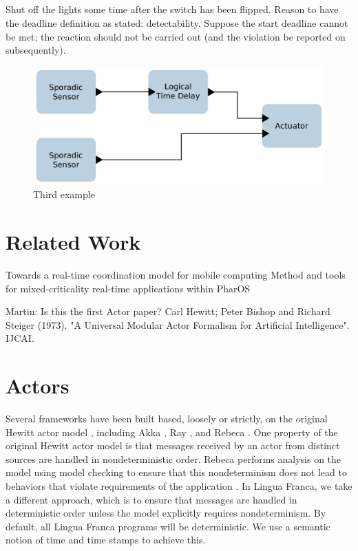 \documentclass[sigconf]{acmart}
\newcommand{\martin}[1]{{\color{blue} Martin: #1}}
\begin{document}
\subsection{}
Shut off the lights some time after the switch has been flipped. Reason to have the deadline definition as stated: detectability. Suppose the start deadline cannot be met; the reaction should not be carried out (and the violation be reported on subsequently).

\begin{figure}[ht]
 \centering
 \includegraphics[width=\linewidth]{img/example-3}
 \caption{Third example}
 \label{fig:example-3}
\end{figure}

\section{Related Work}
\label{sec:related}
Towards a real-time coordination model for mobile computing \cite{hackmann2005towards}
Method and tools for mixed-criticality real-time applications within PharOS \cite{lemerre2011method}

\martin{Is this the first Actor paper? Carl Hewitt; Peter Bishop and Richard Steiger (1973). "A Universal Modular Actor Formalism for Artificial Intelligence". IJCAI.}

\section{Actors}
\label{sec:actor}

Several frameworks have been built based, loosely or strictly, on the
original Hewitt actor model
\cite{Hewitt:77:Actors,Agha:97:ActorComputation}, including Akka
\cite{AkkaAction2016},
Ray \cite{DBLP:journals/corr/abs-1712-05889}, and Rebeca
\cite{DBLP:journals/fuin/SirjaniMSB04}. One property of the original
Hewitt actor model is that messages received by an actor from distinct
sources are handled in nondeterministic order. Rebeca performs analysis
on the model using model checking to ensure that this nondeterminism
does not lead to behaviors that violate requirements of the application
\cite{DBLP:conf/birthday/SirjaniJ11}. In Lingua Franca, we take a
different approach, which is
to ensure that messages are handled in deterministic order unless the
model explicitly requires nondeterminism. By default, all Lingua Franca
programs will be deterministic. We use a semantic notion of time and
time stamps to achieve this.
\end{document}
